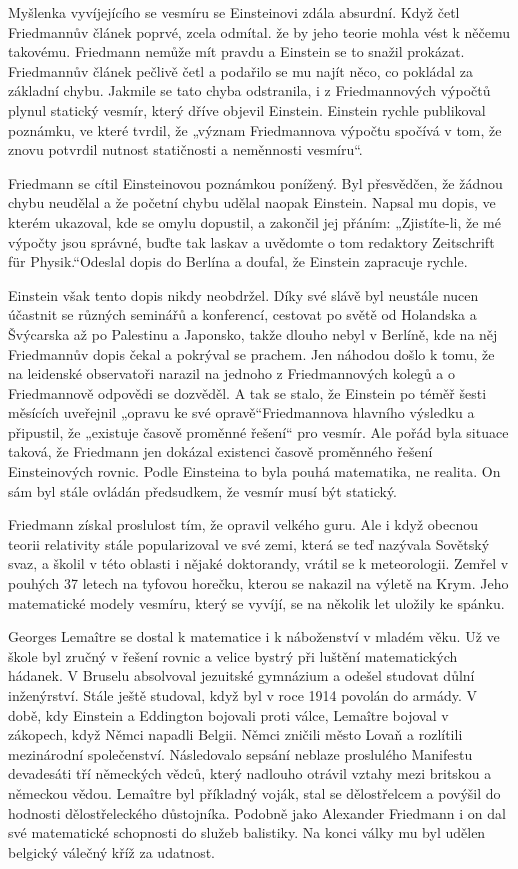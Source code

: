   Myšlenka vyvíjejícího se vesmíru se Einsteinovi zdála absurdní. Když četl Friedmannův článek
  poprvé, zcela odmítal. že by jeho teorie mohla vést k něčemu takovému. Friedmann nemůže mít pravdu
  a Einstein se to snažil prokázat. Friedmannův článek pečlivě četl a podařilo se mu najít něco, co
  pokládal za základní chybu. Jakmile se tato chyba odstranila, i z Friedmannových výpočtů plynul
  statický vesmír, který dříve objevil Einstein. Einstein rychle publikoval poznámku, ve které
  tvrdil, že „význam Friedmannova výpočtu spočívá v tom, že znovu potvrdil nutnost statičnosti a
  neměnnosti vesmíru“. 
  
  Friedmann se cítil Einsteinovou poznámkou ponížený. Byl přesvědčen, že žádnou chybu neudělal a že
  početní chybu udělal naopak Einstein. Napsal mu dopis, ve kterém ukazoval, kde se omylu dopustil,
  a zakončil jej přáním: „Zjistíte-li, že mé výpočty jsou správné, buďte tak laskav a uvědomte o tom
  redaktory Zeitschrift für Physik.“Odeslal dopis do Berlína a doufal, že Einstein zapracuje rychle.
  
  Einstein však tento dopis nikdy neobdržel. Díky své slávě byl neustále nucen účastnit se různých
  seminářů a konferencí, cestovat po světě od Holandska a Švýcarska až po Palestinu a Japonsko,
  takže dlouho nebyl v Berlíně, kde na něj Friedmannův dopis čekal a pokrýval se prachem. Jen
  náhodou došlo k tomu, že na leidenské observatoři narazil na jednoho z Friedmannových kolegů a o
  Friedmannově odpovědi se dozvěděl. A tak se stalo, že Einstein po téměř šesti měsících uveřejnil
  „opravu ke své opravě“Friedmannova hlavního výsledku a připustil, že „existuje časově proměnné
  řešení“ pro vesmír. Ale pořád byla situace taková, že Friedmann jen dokázal existenci časově
  proměnného řešení Einsteinových rovnic. Podle Einsteina to byla pouhá matematika, ne realita. On
  sám byl stále ovládán předsudkem, že vesmír musí být statický. 
  
  Friedmann získal proslulost tím, že opravil velkého guru. Ale i když obecnou teorii relativity
  stále popularizoval ve své zemi, která se teď nazývala Sovětský svaz, a školil v této oblasti i
  nějaké doktorandy, vrátil se k meteorologii. Zemřel v pouhých 37 letech na tyfovou horečku, kterou
  se nakazil na výletě na Krym. Jeho matematické modely vesmíru, který se vyvíjí, se na několik let
  uložily ke spánku. 
  
  Georges Lemaître se dostal k matematice i k náboženství v mladém věku. Už ve škole byl zručný v
  řešení rovnic a velice bystrý při luštění matematických hádanek. V Bruselu absolvoval jezuitské
  gymnázium a odešel studovat důlní inženýrství. Stále ještě studoval, když byl v roce 1914 povolán
  do armády. V době, kdy Einstein a Eddington bojovali proti válce, Lemaître bojoval v zákopech,
  když Němci napadli Belgii. Němci zničili město Lovaň a rozlítili mezinárodní společenství.
  Následovalo sepsání neblaze proslulého Manifestu devadesáti tří německých vědců, který nadlouho
  otrávil vztahy mezi britskou a německou vědou. Lemaître byl příkladný voják, stal se dělostřelcem
  a povýšil do hodnosti dělostřeleckého důstojníka. Podobně jako Alexander Friedmann i on dal své
  matematické schopnosti do služeb balistiky. Na konci války mu byl udělen belgický válečný kříž za
  udatnost. 
  
